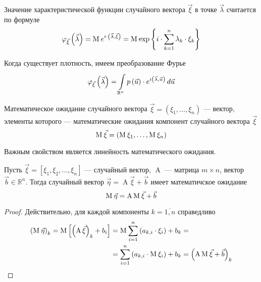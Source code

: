 \begin{definition}
  \label{def:characteristicFunction}
  Значение характеристической функции случайного вектора $\vec{\xi}$
  в точке $\vec{\lambda}$ считается по формуле
  $$\varphi_{\vec{\xi}}\left( \vec{\lambda} \right)
      = \mean{e^{i \cdot \left( \vec{\lambda}, \vec{\xi} \right)}}
      = \mean{
      \exp{\left\{ i \cdot \sum_{k=1}^n \lambda_k \cdot \xi_k \right\}}}$$

  Когда существует плотность, имеем преобразование Фурье
  $$\varphi_{\vec{\xi}}\left( \vec{\lambda} \right)
      = \integrall{\mathbb{R}^n}{d\vec{u}}{\pdf{\vec{u}} \cdot
      e^{i \left( \vec{\lambda}, \vec{u} \right)}}$$
\end{definition}

\begin{definition}
  Математическое ожидание случайного вектора
  $\vec{\xi} = \left( \xi_1, \dots, \xi_n \right)$ --- вектор,
  элементы которого --- математические ожидания компонент
  случайного вектора $\vec{\xi}$
  $$\mean{\vec{\xi}} = \left( \mean{\xi_1}, \dots, \mean{\xi_n} \right)$$
\end{definition}

Важным свойством является линейность математического ожидания.
\begin{affirmation}
  Пусть $\vec{\xi} = \left[ \xi_1, \xi_2, \dots, \xi_n \right]$ --- случайный
  вектор, $\operatorname{A}$ --- матрица $m \times n$,
  вектор $\vec{b} \in \mathbb{R}^n$.
  Тогда случайный вектор $\vec{\eta} = \operatorname{A}\vec{\xi} + \vec{b}$
  имеет математичское ожидание
  \begin{equation*}
    \mean{\vec{\eta}} = \operatorname{A} \mean{\vec{\xi}} + \vec{b}
  \end{equation*}
\end{affirmation}
\begin{proof}
  Действительно, для каждой компоненты $k = \overline{1, n}$
  справедливо
  \begin{equation*}
    \begin{split}
      \left( \mean{\vec{\eta}} \right)_k
      = \Mean{\left( \operatorname{A} \vec{\xi} \right)_k + b_i}
      &= \mean{\sum_{i=1}^{n} \left( a_{k,i} \cdot \xi_i \right)} + b_k = \\
      &= \sum_{i=1}^{n} \left( a_{k,i} \cdot \mean{\xi_i} \right) + b_k
      = \left( \operatorname{A} \mean{\vec{\xi}} + \vec{b} \right)_k
    \end{split}
  \end{equation*}
\end{proof}

